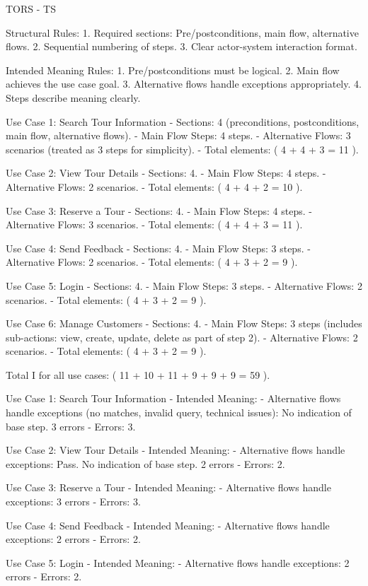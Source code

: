 TORS - TS

Structural Rules:
1. Required sections: Pre/postconditions, main flow, alternative flows.
2. Sequential numbering of steps.
3. Clear actor-system interaction format.

Intended Meaning Rules:
1. Pre/postconditions must be logical.
2. Main flow achieves the use case goal.
3. Alternative flows handle exceptions appropriately.
4. Steps describe meaning clearly.

Use Case 1: Search Tour Information
- Sections: 4 (preconditions, postconditions, main flow, alternative flows).
- Main Flow Steps: 4 steps.
- Alternative Flows: 3 scenarios (treated as 3 steps for simplicity).
- Total elements: ( 4 + 4 + 3 = 11 ).

Use Case 2: View Tour Details
- Sections: 4.
- Main Flow Steps: 4 steps.
- Alternative Flows: 2 scenarios.
- Total elements: ( 4 + 4 + 2 = 10 ).

Use Case 3: Reserve a Tour
- Sections: 4.
- Main Flow Steps: 4 steps.
- Alternative Flows: 3 scenarios.
- Total elements: ( 4 + 4 + 3 = 11 ).

Use Case 4: Send Feedback
- Sections: 4.
- Main Flow Steps: 3 steps.
- Alternative Flows: 2 scenarios.
- Total elements: ( 4 + 3 + 2 = 9 ).

Use Case 5: Login
- Sections: 4.
- Main Flow Steps: 3 steps.
- Alternative Flows: 2 scenarios.
- Total elements: ( 4 + 3 + 2 = 9 ).

Use Case 6: Manage Customers
- Sections: 4.
- Main Flow Steps: 3 steps (includes sub-actions: view, create, update, delete as part of step 2).
- Alternative Flows: 2 scenarios.
- Total elements: ( 4 + 3 + 2 = 9 ).

Total I for all use cases: ( 11 + 10 + 11 + 9 + 9 + 9 = 59 ).

Use Case 1: Search Tour Information
- Intended Meaning:
- Alternative flows handle exceptions (no matches, invalid query, technical issues): No indication of base step. 3 errors
- Errors: 3.

Use Case 2: View Tour Details
- Intended Meaning:
- Alternative flows handle exceptions: Pass. No indication of base step. 2 errors
- Errors: 2.

Use Case 3: Reserve a Tour
- Intended Meaning:
- Alternative flows handle exceptions: 3 errors
- Errors: 3.

Use Case 4: Send Feedback
- Intended Meaning:
- Alternative flows handle exceptions: 2 errors
- Errors: 2.

Use Case 5: Login
- Intended Meaning:
- Alternative flows handle exceptions: 2 errors
- Errors: 2.

